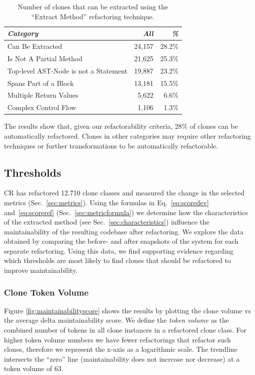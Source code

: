 \documentclass[sigconf,review,anonymous]{acmart}
\begin{document}
\begin{table}
\centering
\begin{tabular}{@{}lrr@{}}
\toprule
\textit{\textbf{Category}} & \textit{\textbf{All}} & \textit{\textbf{\%}} \\ \midrule
Can Be Extracted & 24,157 & 28.2\%  \\
Is Not A Partial Method & 21,625 & 25.3\% \\
Top-level AST-Node is not a Statement & 19,887 & 23.2\% \\
Spans Part of a Block & 13,181 & 15.5\%  \\
Multiple Return Values & 5,622 & 6.6\%  \\
Complex Control Flow & 1,106 & 1.3\% \\
\end{tabular}
\caption{Number of clones that can be extracted using the ``Extract Method'' refactoring technique.}
\label{tab:refactorability}
\end{table}

The results show that, given our refactorability criteria, 28\% of clones can be automatically refactored. Clones in other categories may require other refactoring techniques or further transformations to be automatically refactorable.

\subsection{Thresholds}
CR has refactored 12.710 clone classes and measured the change in the selected metrics (Sec.~\ref{sec:metrics}). %
Using the formulas in Eq.~\ref{eq:scoredev} and~\ref{eq:scoreref} (Sec.~\ref{sec:metricformula}) we determine how the characteristics of the extracted method (see Sec.~\ref{sec:characteristics}) influence the maintainability of the resulting codebase after refactoring. We explore the data obtained by comparing the before- and after snapshots of the system for each separate refactoring. Using this data, we find supporting evidence regarding which thresholds are most likely to find clones that should be refactored to improve maintainability.

\subsubsection{Clone Token Volume} \label{sec:clonetokenvolume}
Figure \ref{fig:maintainabilityscore} shows the results by plotting the clone volume vs the average delta maintainability score. We define the \textit{token volume} as the combined number of tokens in all clone instances in a refactored clone class. For higher token volume numbers we have fewer refactorings that refactor such clones, therefore we represent the x-axis as a logarithmic scale. The trendline intersects the ``zero'' line (maintainability does not increase nor decrease) at a token volume of 63.
\end{document}
